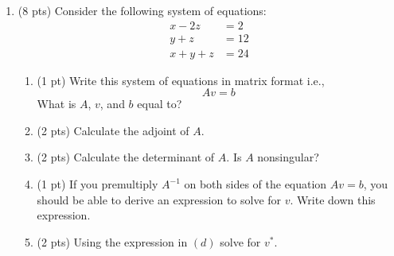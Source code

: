 \documentclass{./../../latex/tests}
\begin{document}
\begin{enumerate}
\item (8 pts) Consider the following system of equations:
\begin{align*}
x-2z & = 2 \\
y+z & = 12 \\
x+y+z &= 24	
\end{align*}
\begin{enumerate}
  \item (1 pt) Write this system of equations in matrix format i.e., \[ Av=b \]
  What is $A$, $v$, and $b$ equal to?
  \newpage
   \item (2 pts) Calculate the adjoint of $A$. \vspace{8.5cm}
  \item (2 pts) Calculate the determinant of $A$. Is $A$ nonsingular? \vspace{4.5cm}
  \item (1 pt) If you premultiply $A^{-1}$ on both sides of the equation $ Av=b $, you should be able to derive an expression to solve for $v$. Write down this expression. \vspace{2cm}
  \item (2 pts) Using the expression in $(d)$ solve for $v^*$. 
\end{enumerate}

\newpage
\end{enumerate}
\end{document}

